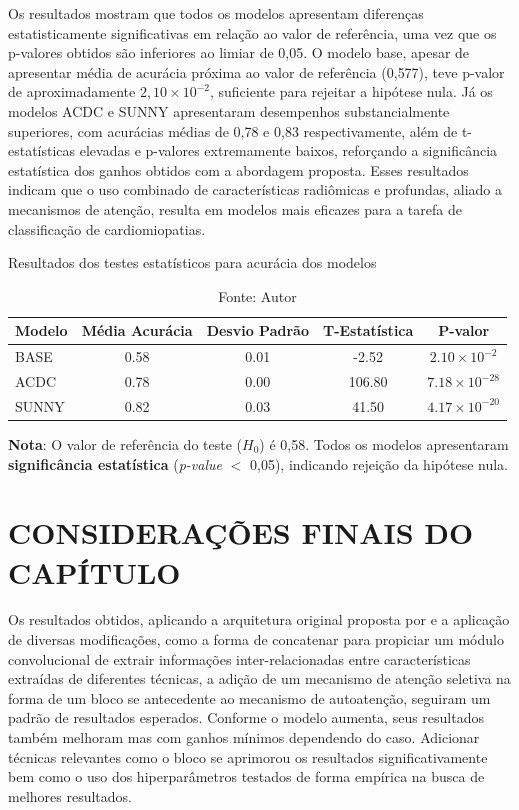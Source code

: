 Os resultados mostram que todos os modelos apresentam diferenças estatisticamente significativas em relação ao valor de referência, uma vez que os p-valores obtidos são inferiores ao limiar de 0,05. O modelo base, apesar de apresentar média de acurácia próxima ao valor de referência (0{,}577), teve p-valor de aproximadamente $2{,}10 \times 10^{-2}$, suficiente para rejeitar a hipótese nula. Já os modelos ACDC e SUNNY apresentaram desempenhos substancialmente superiores, com acurácias médias de 0,78 e 0,83 respectivamente, além de t-estatísticas elevadas e p-valores extremamente baixos, reforçando a significância estatística dos ganhos obtidos com a abordagem proposta. Esses resultados indicam que o uso combinado de características radiômicas e profundas, aliado a mecanismos de atenção, resulta em modelos mais eficazes para a tarefa de classificação de cardiomiopatias.

\begin{table}[H]
    \centering
    \caption{Resultados dos testes estatísticos para acurácia dos modelos}
    \begin{tabular}{|l|c|c|c|c|}
    \hline
    \textbf{Modelo} & \textbf{Média Acurácia} & \textbf{Desvio Padrão} & \textbf{T-Estatística} & \textbf{P-valor} \\
    \hline
    BASE  & 0.58 & 0.01 & -2.52 & $2.10 \times 10^{-2}$ \\
    ACDC  & 0.78 & 0.00 & 106.80 & $7.18 \times 10^{-28}$ \\
    SUNNY & 0.82 & 0.03 & 41.50 & $4.17 \times 10^{-20}$ \\
    \hline
    \end{tabular}
    \caption*{Fonte: Autor}
    \begin{flushleft}
    \footnotesize
    \textbf{Nota}: O valor de referência do teste ($H_0$) é 0{,}58. Todos os modelos apresentaram \textbf{significância estatística} (\textit{p-value} $<$ 0{,}05), indicando rejeição da hipótese nula.
    \end{flushleft}
    \label{tab:teste_estatistico}
\end{table}



\section{CONSIDERAÇÕES FINAIS DO CAPÍTULO} 
\label{sec:cap6_consideracoes_finais}

Os resultados obtidos, aplicando a arquitetura original proposta por  e a aplicação de diversas modificações, como a forma de concatenar para propiciar um módulo convolucional de extrair informações inter-relacionadas entre características extraídas de diferentes técnicas, a adição de um mecanismo de atenção seletiva na forma de um bloco \gls{se} antecedente ao mecanismo de autoatenção, seguiram um padrão de resultados esperados. Conforme o modelo aumenta, seus resultados também melhoram mas com ganhos mínimos dependendo do caso. Adicionar técnicas relevantes como o bloco \gls{se} aprimorou os resultados significativamente bem como o uso dos hiperparâmetros testados de forma empírica na busca de melhores resultados. 

